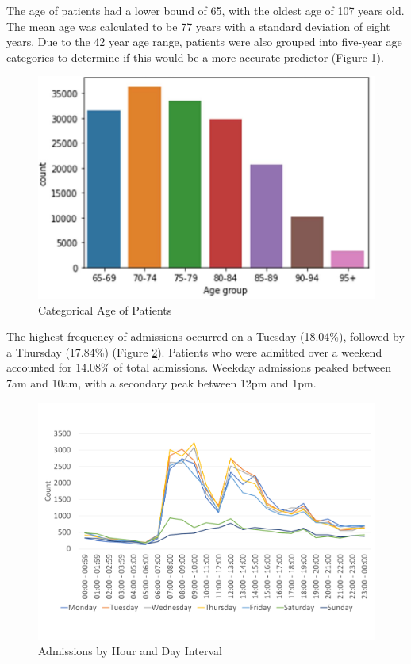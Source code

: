 \documentclass[../thesis.tex]{subfiles}
\begin{document}
The age of patients had a lower bound of 65, with the oldest age of 107 years old. The mean age was calculated to be 77 years with a standard deviation of eight years. Due to the 42 year age range, patients were also grouped into five-year age categories to determine if this would be a more accurate predictor (Figure \ref{fig:AgeGroup}). 

\begin{figure}[h!]
    \centering
    \includegraphics[scale=0.6]{Chapters/Chapter5/Figures/Age group.pdf}
    \caption{Categorical Age of Patients}
    \label{fig:AgeGroup}
\end{figure}

The highest frequency of admissions occurred on a Tuesday (18.04\%), followed by a Thursday (17.84\%) (Figure \ref{fig:AdmissionTimes}). Patients who were admitted over a weekend accounted for 14.08\% of total admissions. Weekday admissions peaked between 7am and 10am, with a secondary peak between 12pm and 1pm.

\begin{figure}[h!]
    \centering
    \includegraphics[width=\textwidth]{Chapters/Chapter5/Figures/AdmissionTimes.pdf}
    \caption{Admissions by Hour and Day Interval}
    \label{fig:AdmissionTimes}
\end{figure}
\end{document}
